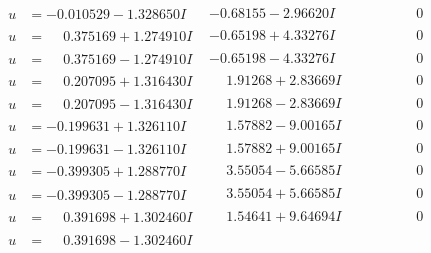 \documentclass[1p]{elsarticle_modified}
\theoremstyle{definition}
\begin{document}
$$\begin{array}{c|c|c}
 \hline 
\begin{aligned}
u &= -0.010529 - 1.328650 I\end{aligned}
 & -0.68155 - 2.96620 I & \phantom{-0.000000 } 0 \\ \hline\begin{aligned}
u &= \phantom{-}0.375169 + 1.274910 I\end{aligned}
 & -0.65198 + 4.33276 I & \phantom{-0.000000 } 0 \\ \hline\begin{aligned}
u &= \phantom{-}0.375169 - 1.274910 I\end{aligned}
 & -0.65198 - 4.33276 I & \phantom{-0.000000 } 0 \\ \hline\begin{aligned}
u &= \phantom{-}0.207095 + 1.316430 I\end{aligned}
 & \phantom{-}1.91268 + 2.83669 I & \phantom{-0.000000 } 0 \\ \hline\begin{aligned}
u &= \phantom{-}0.207095 - 1.316430 I\end{aligned}
 & \phantom{-}1.91268 - 2.83669 I & \phantom{-0.000000 } 0 \\ \hline\begin{aligned}
u &= -0.199631 + 1.326110 I\end{aligned}
 & \phantom{-}1.57882 - 9.00165 I & \phantom{-0.000000 } 0 \\ \hline\begin{aligned}
u &= -0.199631 - 1.326110 I\end{aligned}
 & \phantom{-}1.57882 + 9.00165 I & \phantom{-0.000000 } 0 \\ \hline\begin{aligned}
u &= -0.399305 + 1.288770 I\end{aligned}
 & \phantom{-}3.55054 - 5.66585 I & \phantom{-0.000000 } 0 \\ \hline\begin{aligned}
u &= -0.399305 - 1.288770 I\end{aligned}
 & \phantom{-}3.55054 + 5.66585 I & \phantom{-0.000000 } 0 \\ \hline\begin{aligned}
u &= \phantom{-}0.391698 + 1.302460 I\end{aligned}
 & \phantom{-}1.54641 + 9.64694 I & \phantom{-0.000000 } 0 \\ \hline\begin{aligned}
u &= \phantom{-}0.391698 - 1.302460 I\end{aligned}

\end{array}$$
\end{document}
